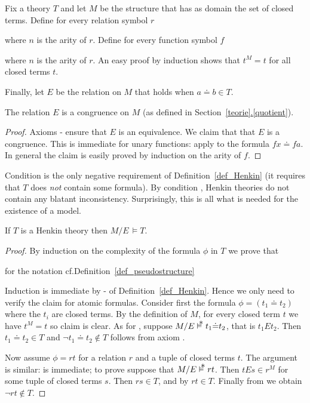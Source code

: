 Fix a theory $T$ and let \emph{$M$} be the structure that has as domain the set of closed terms. Define for every relation symbol $r$


where $n$ is the arity of $r$.
%
Define for every function symbol $f$


where $n$ is the arity of $r$.
%
An easy proof by induction shows that $t^M=t$ for all closed terms $t$. 

Finally, let \emph{$E$} be the relation on $M$ that holds when $a{\doteq}b\in T$. 

\begin{lemma}
The relation $E$ is a congruence on $M$ (as defined in Section~\hyperref[quotient]{\ref*{teorie}.\ref*{quotient}}).
\end{lemma}

\begin{proof}
Axioms - ensure that $E$ is an equivalence. We claim that that $E$ is a congruence. This is immediate for unary functions: apply  to the formula $fx\doteq fa$. In general the claim is easily proved by induction on the arity of $f$.
\end{proof}

Condition  is the only negative requirement of Definition~\ref{def_Henkin} (it requires that $T$ does \textit{not\/} contain some formula). By condition , Henkin theories do not contain any blatant inconsistency. Surprisingly, this is all what is needed for the existence of a model.

\begin{theorem}
If $T$ is a Henkin theory then $M{/}E\,\models T$. 
\end{theorem}

\begin{proof}
By induction on the complexity of the formula $\phi$ in $T$ we prove that

\hfill for the notation cf.\@ Definition~\ref{def_pseudostructure}


Induction is immediate by - of Definition~\ref{def_Henkin}.
%
Hence we only need to verify the claim for atomic formulas.
%
Consider first the formula $\phi= (t_1{\doteq}t_2)$ where the $t_i$ are closed terms.
%
By the definition of $M$, for every closed term $t$ we have $t^M=t$ so claim  is clear. As for , suppose $M/E\pmodels t_1{\doteq}t_2$, that is  $t_1Et_2$.
Then $t_1{\doteq}t_2\in T$ and $\neg t_1{\doteq}t_2\notin T$ follows from axiom .

Now assume $\phi=rt$ for a relation $r$ and a tuple of closed terms $t$. The argument is similar:  is immediate; to prove  suppose that $M/E\pmodels rt$. Then $tEs\in r^M$ for some tuple of closed terms $s$. Then $rs\in T$, and by  $rt\in T$. Finally from  we obtain $\neg rt\notin T$.
\end{proof}

